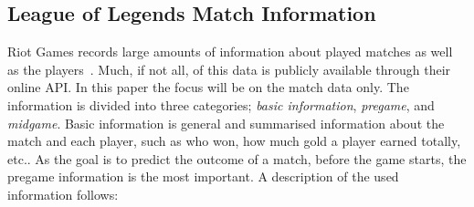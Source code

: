 \subsection{League of Legends Match Information}\label{sec:matchdata}
Riot Games records large amounts of information about played matches as well as the players~\cite{matchinfo}. Much, if not all, of this data is publicly available through their online API. In this paper the focus will be on the match data only. The information is divided into three categories; \emph{basic information}, \emph{pregame}, and \emph{midgame}. Basic information is general and summarised information about the match and each player, such as who won, how much gold a player earned totally, etc.. As the goal is to predict the outcome of a match, before the game starts, the pregame information is the most important. A description of the used information follows:
